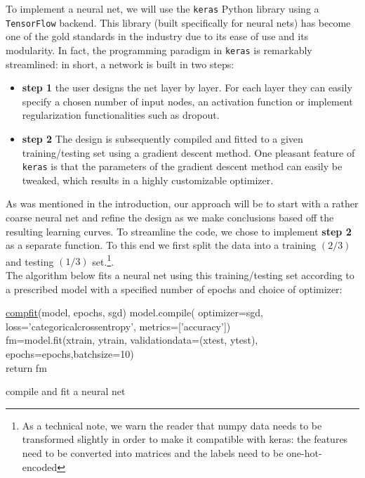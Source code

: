 \documentclass[14pt]{article}
\theoremstyle{plain}
\theoremstyle{definition}
\newcommand{\un}{\textunderscore}
\begin{document}
To implement a neural net, we will  use the \texttt{keras} Python library using a \texttt{TensorFlow} backend. This library (built specifically for neural nets) has become one of the gold standards in the industry due to its ease of use and its modularity. In fact, the programming paradigm in \texttt{keras} is remarkably streamlined: in short, a network is built in two steps:
\begin{itemize}
\item {\bf step 1} the user designs the net layer by layer. For each layer they can easily specify a chosen number of input nodes, an activation function or implement regularization functionalities such as dropout.
\item{\bf step 2} The design is subsequently compiled and fitted to a given training/testing set using a gradient descent method. One pleasant feature of \texttt{keras} is that the parameters of the gradient descent method can easily be tweaked, which results in a highly customizable optimizer.
\end{itemize}
As was mentioned in the introduction, our approach will be to start with a rather coarse neural net and refine the design as we make conclusions based off the resulting learning curves. To streamline the code, we chose to implement {\bf step 2} as a separate function. To this end we first split the data into a training $(2/3)$ and testing $(1/3)$ set.\footnote{ As a technical note, we warn the reader that numpy data needs to be transformed slightly in order to make it compatible with keras: the features need to be converted into matrices and the labels need to be one-hot-encoded}.\\ The algorithm below fits a neural net using this training/testing set according to a prescribed model with a specified number of epochs and choice of optimizer: 
\begin{algorithm}


    \underline{comp\un fit}(model, epochs, sgd)\;
model.compile( optimizer=sgd, loss='categorical\un crossentropy', metrics=['accuracy'])\\
fm=model.fit(x\un train, y\un train, validation\un data=(x\un test, y\un test), epochs=epochs,batch\un size=10)\\
return fm
   \caption{compile and fit a neural net }
\end{algorithm}
\end{document}
